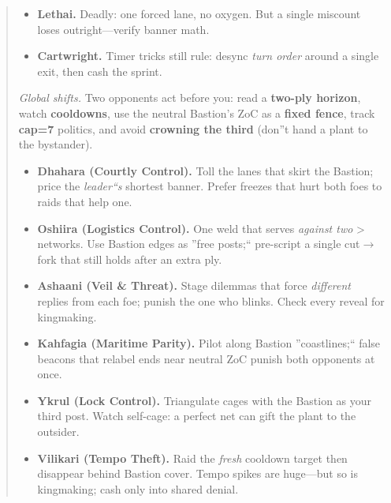 \documentclass[11pt]{article}
\begin{document}
\begin{quote}
\begin{tcolorbox}[enhanced,breakable,title={2$\times$4 Micro-Strip --- What Survives},
  colback=white,colframe=royal,boxrule=0.8pt]
\begin{itemize}[leftmargin=1.1em,itemsep=0.3em]
\item \textbf{Lethai.} Deadly: one forced lane, no oxygen. But a single miscount loses outright---verify banner math.

\item \textbf{Cartwright.} Timer  tricks still rule: desync \emph{turn order} around a single exit, then cash the sprint.
\end{itemize}
\end{tcolorbox}

\begin{tcolorbox}[enhanced,breakable,title={Triad (3-Player, Bastion) --- What Changes},
  colback=white,colframe=royal,boxrule=0.8pt]
\small
\noindent \textit{Global shifts.} Two opponents act before you: read a \textbf{two-ply horizon}, watch \textbf{cooldowns}, use the neutral Bastion's ZoC as a \textbf{fixed fence}, track \textbf{cap=7} politics, and avoid \textbf{crowning the third} (don''t hand a plant to the bystander).

\begin{itemize}[leftmargin=1.1em,itemsep=0.3em]

\item \textbf{Dhahara (Courtly Control).} Toll the lanes that skirt the Bastion; price the \emph{leader``s} shortest banner. Prefer freezes that hurt both foes to raids that help one.

\item \textbf{Oshiira (Logistics Control).} One weld that serves \emph{against two} > networks. Use Bastion edges as ''free posts;`` pre-script a single cut$\rightarrow$fork that still holds after an extra ply.

\item \textbf{Ashaani (Veil \& Threat).} Stage dilemmas that force \emph{different} replies from each foe; punish the one who blinks. Check every reveal for kingmaking.

\item \textbf{Kahfagia (Maritime Parity).} Pilot along Bastion ''coastlines;`` false beacons that relabel ends near neutral ZoC punish both opponents at once.

\item \textbf{Ykrul (Lock Control).} Triangulate cages with the Bastion as your third post. Watch self-cage: a perfect net can gift the plant to the outsider.

\item \textbf{Vilikari (Tempo Theft).} Raid the \emph{fresh} cooldown target then disappear behind Bastion cover. Tempo spikes are huge---but so is kingmaking; cash only into shared denial.


\end{itemize}
\end{tcolorbox}
\end{quote}
\end{document}
